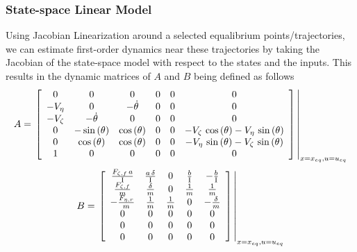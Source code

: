 \documentclass[conference, onecolumn]{IEEEtran}
\begin{document}
\subsubsection{State-space Linear Model}
Using Jacobian Linearization around a selected equalibrium points/trajectories, we can estimate first-order dynamics near these trajectories by taking the Jacobian of the state-space model with respect to the states and the inputs. 
This results in the dynamic matrices of $A$ and $B$ being defined as follows\[
    A = \eval{\left\lbrack \begin{array}{cccccc}
        0 & 0 & 0 & 0 & 0 & 0\\
        -V_{\eta }  & 0 & -\dot{\theta}  & 0 & 0 & 0\\
        -V_{\zeta }  & -\dot{\theta}  & 0 & 0 & 0 & 0\\
        0 & -\sin \left(\theta \right) & \cos \left(\theta \right) & 0 & 0 & -V_{\zeta } \,\cos \left(\theta \right)-V_{\eta } \,\sin \left(\theta \right)\\
        0 & \cos \left(\theta \right) & \cos \left(\theta \right) & 0 & 0 & -V_{\eta } \,\sin \left(\theta \right)-V_{\zeta } \,\sin \left(\theta \right)\\
        1 & 0 & 0 & 0 & 0 & 0
    \end{array}\right\rbrack}_{x = x_{eq}, u = u_{eq}}
\]\[
    B = \eval{\left\lbrack \begin{array}{ccccc}
        \frac{F_{\zeta ,f} \,a}{\textrm{I}} & \frac{a\,\delta }{\textrm{I}} & 0 & \frac{b}{\textrm{I}} & -\frac{b}{\textrm{I}}\\
        \frac{F_{\zeta ,f} }{m} & \frac{\delta }{m} & 0 & \frac{1}{m} & \frac{1}{m}\\
        -\frac{F_{\eta ,r} }{m} & \frac{1}{m} & \frac{1}{m} & 0 & -\frac{\delta }{m}\\
        0 & 0 & 0 & 0 & 0\\
        0 & 0 & 0 & 0 & 0\\
        0 & 0 & 0 & 0 & 0
    \end{array}\right\rbrack}_{x = x_{eq}, u = u_{eq}}
\]
\end{document}
